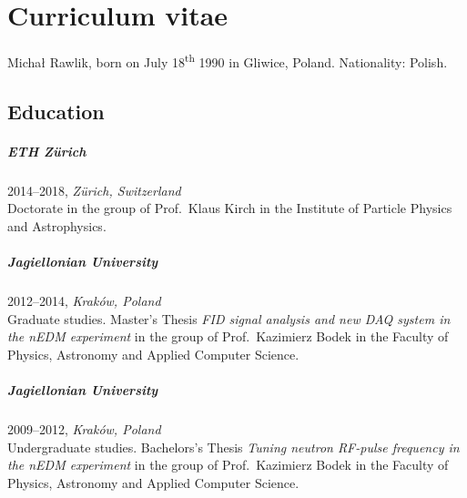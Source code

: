



\manualmark
\markboth{\spacedlowsmallcaps{\bibname}}{\spacedlowsmallcaps{\bibname}} 


\begingroup

\let\clearpage\relax
\let\cleardoublepage\relax
\let\cleardoublepage\relax

\chapter*{Curriculum vitae} %

Michał Rawlik, born on July 18\textsuperscript{th} 1990 in Gliwice, Poland. Nationality: Polish. 

\section*{Education}
\paragraph{ETH Zürich} 2014--2018, \emph{Zürich, Switzerland}\\
Doctorate in the group of Prof.\ Klaus Kirch in the Institute of Particle Physics and Astrophysics.

\paragraph{Jagiellonian University} 2012--2014, \emph{Kraków, Poland}\\
Graduate studies. Master's Thesis \emph{FID signal analysis and new DAQ system in the nEDM experiment} in the group of Prof.\ Kazimierz Bodek in the
Faculty of Physics, Astronomy and Applied Computer Science.

\paragraph{Jagiellonian University} 2009--2012, \emph{Kraków, Poland}\\
Undergraduate studies. Bachelors's Thesis \emph{Tuning neutron RF-pulse frequency in the nEDM experiment} in the group of Prof.\ Kazimierz Bodek in the
Faculty of Physics, Astronomy and Applied Computer Science.

